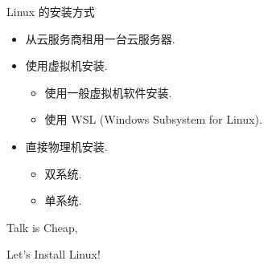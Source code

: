 \documentclass{beamer}
\begin{document}
\begin{frame}{Linux 的安装方式}
    \begin{itemize}
        \item 从云服务商租用一台云服务器.
        \item 使用虚拟机安装.
        \begin{itemize}
            \item 使用一般虚拟机软件安装.
            \item 使用 WSL (Windows Subsystem for Linux).
        \end{itemize}
        \item 直接物理机安装.
        \begin{itemize}
            \item 双系统.
            \item 单系统.
        \end{itemize}
    \end{itemize}
\end{frame}

\begin{frame}
    \begin{center}
        {\Huge\calligra Talk is Cheap,}
    \end{center}
    \begin{center}
        {\Huge\calligra Let’s Install Linux!}
    \end{center}
\end{frame}
\end{document}
